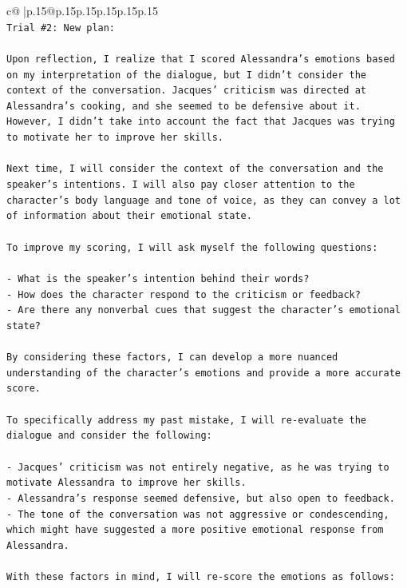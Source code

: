 \documentclass{article}
\begin{document}
{\begin{supertabular}{c@{$\;$}|p{.15\linewidth}@{}p{.15\linewidth}p{.15\linewidth}p{.15\linewidth}p{.15\linewidth}p{.15\linewidth}}
{{{\\ 
\texttt{Trial \#2: New plan: } \\
\\ 
\texttt{Upon reflection, I realize that I scored Alessandra's emotions based on my interpretation of the dialogue, but I didn't consider the context of the conversation. Jacques' criticism was directed at Alessandra's cooking, and she seemed to be defensive about it. However, I didn't take into account the fact that Jacques was trying to motivate her to improve her skills.} \\
\\ 
\texttt{Next time, I will consider the context of the conversation and the speaker's intentions. I will also pay closer attention to the character's body language and tone of voice, as they can convey a lot of information about their emotional state.} \\
\\ 
\texttt{To improve my scoring, I will ask myself the following questions:} \\
\\ 
\texttt{{-} What is the speaker's intention behind their words?} \\
\texttt{{-} How does the character respond to the criticism or feedback?} \\
\texttt{{-} Are there any nonverbal cues that suggest the character's emotional state?} \\
\\ 
\texttt{By considering these factors, I can develop a more nuanced understanding of the character's emotions and provide a more accurate score.} \\
\\ 
\texttt{To specifically address my past mistake, I will re{-}evaluate the dialogue and consider the following:} \\
\\ 
\texttt{{-} Jacques' criticism was not entirely negative, as he was trying to motivate Alessandra to improve her skills.} \\
\texttt{{-} Alessandra's response seemed defensive, but also open to feedback.} \\
\texttt{{-} The tone of the conversation was not aggressive or condescending, which might have suggested a more positive emotional response from Alessandra.} \\
\\ 
\texttt{With these factors in mind, I will re{-}score the emotions as follows:} \\
}}}
\end{supertabular}}
\end{document}
